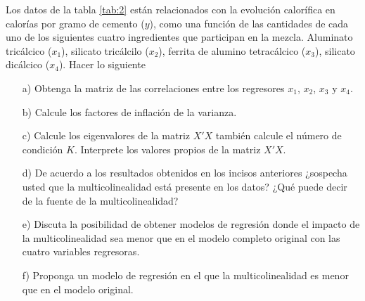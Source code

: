 \documentclass[10.5pt,notitlepage]{article}
\theoremstyle{plain}
\begin{document}
\begin{exo}
Los datos de la tabla \ref{tab:2}
están relacionados con la evolución calorífica en calorías por gramo de cemento
(\(y\)), como una función de las cantidades de cada uno de los siguientes cuatro
ingredientes que participan en la mezcla. Aluminato tricálcico (\(x_1\)), silicato
tricálcilo (\(x_2\)), ferrita de alumino tetracálcico (\(x_3\)), silicato dicálcico (\(x_4\)). Hacer lo siguiente
\begin{itemize}
    \item[a)] Obtenga la matriz de las correlaciones entre los regresores \(x_1\), \(x_2\), \(x_3\) y \(x_4\).
    \item[b)] Calcule los factores de inflación de la varianza.
    \item[c)] Calcule los eigenvalores de la matriz \(X'X\) también calcule el número de
condición \(K\). Interprete los valores propios de la matriz \(X'X\).
    \item[d)]De acuerdo a los resultados obtenidos en los incisos anteriores ¿sospecha
usted que la multicolinealidad está presente en los datos? ¿Qué puede decir
de la fuente de la multicolinealidad?
    \item[e)] Discuta la posibilidad de obtener modelos de regresión donde el impacto de la multicolinealidad sea menor que en el modelo completo original con las cuatro variables regresoras.
    \item[f)]Proponga un modelo de regresión en el que la multicolinealidad es menor
que en el modelo original.
\end{itemize}
\end{exo}
\end{document}
